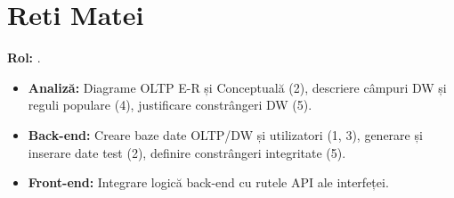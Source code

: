 \section{Reti Matei}
\textbf{Rol:} .
\begin{itemize}
    \item \textbf{Analiză:} Diagrame OLTP E-R și Conceptuală (2), descriere câmpuri DW și reguli populare (4), justificare constrângeri DW (5).
    \item \textbf{Back-end:} Creare baze date OLTP/DW și utilizatori (1, 3), generare și inserare date test (2), definire constrângeri integritate (5).
    \item \textbf{Front-end:} Integrare logică back-end cu rutele API ale interfeței.
\end{itemize}